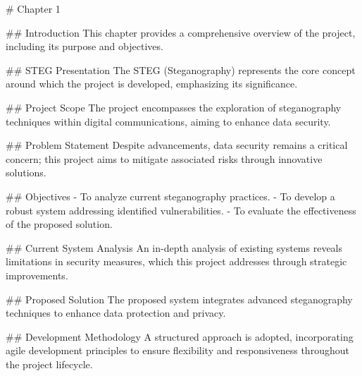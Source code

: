 # Chapter 1

## Introduction
This chapter provides a comprehensive overview of the project, including its purpose and objectives.

## STEG Presentation
The STEG (Steganography) represents the core concept around which the project is developed, emphasizing its significance.

## Project Scope
The project encompasses the exploration of steganography techniques within digital communications, aiming to enhance data security.

## Problem Statement
Despite advancements, data security remains a critical concern; this project aims to mitigate associated risks through innovative solutions.

## Objectives
- To analyze current steganography practices.
- To develop a robust system addressing identified vulnerabilities.
- To evaluate the effectiveness of the proposed solution.

## Current System Analysis
An in-depth analysis of existing systems reveals limitations in security measures, which this project addresses through strategic improvements.

## Proposed Solution
The proposed system integrates advanced steganography techniques to enhance data protection and privacy.

## Development Methodology
A structured approach is adopted, incorporating agile development principles to ensure flexibility and responsiveness throughout the project lifecycle.